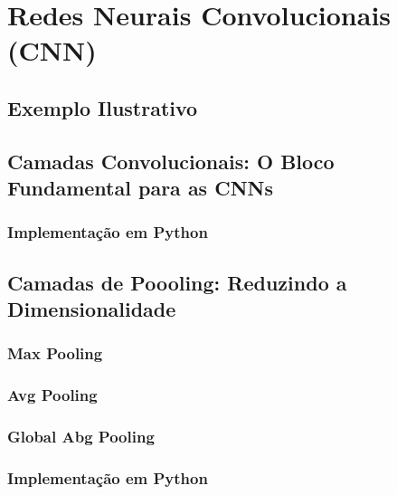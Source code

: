 
\chapter{Redes Neurais Convolucionais (CNN)}
\label{cap:cnn}


\section{Exemplo Ilustrativo}

\section{Camadas Convolucionais: O Bloco Fundamental para as CNNs}

\subsection{Implementação em Python}

\section{Camadas de Poooling: Reduzindo a Dimensionalidade}

\subsection{Max Pooling}

\subsection{Avg Pooling}

\subsection{Global Abg Pooling}

\subsection{Implementação em Python}

